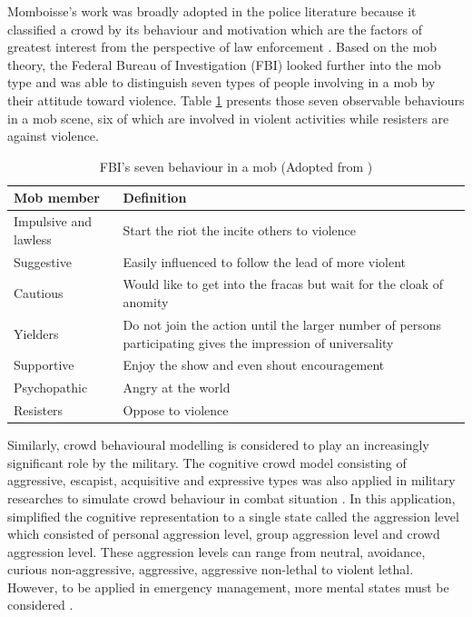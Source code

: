 Momboisse’s work was broadly adopted in the police literature because it classified a crowd by its behaviour and motivation which are the factors of greatest interest from the perspective of law enforcement \citep{FBI1967}. Based on the mob theory, the Federal Bureau of Investigation (FBI) looked further into the mob type and was able to distinguish seven types of people involving in a mob by their attitude toward violence. Table \ref{table:fbiMobBehavior} presents those seven observable behaviours in a mob scene, six of which are involved in violent activities while resisters are against violence.

\begin{table}
	\caption{FBI's seven behaviour in a mob (Adopted from \citet{FBI1967})}
	\label{table:fbiMobBehavior}
	\centering
	\begin{tabular}{|l|p{10cm}|}
		\hline
		\textbf{Mob member} & \textbf{Definition} \\ \hline \hline
		Impulsive and lawless & Start the riot the incite others to violence \\ \hline
		Suggestive &  Easily influenced to follow the lead of more violent \\ \hline
		Cautious & Would like to get into the fracas but wait for the cloak of anomity \\ \hline
		Yielders & Do not join the action until the larger number of persons participating gives the impression of universality \\ \hline
		Supportive & Enjoy the show and even shout encouragement \\ \hline
		Psychopathic & Angry at the world \\ \hline
		Resisters & Oppose to violence \\ \hline
	\end{tabular}
\end{table}

Similarly, crowd behavioural modelling is considered to play an increasingly significant role by the military. The cognitive crowd model consisting of aggressive, escapist, acquisitive and expressive types was also applied in military researches to simulate crowd behaviour in combat situation \citep{Petty2004}. In this application, \citet{Nguyen2005} simplified the cognitive representation to a single state called the aggression level which consisted of personal aggression level, group aggression level and crowd aggression level. These aggression levels can range from neutral, avoidance, curious non-aggressive, aggressive, aggressive non-lethal to violent lethal. However, to be applied in emergency management, more mental states must be considered \citep{Zhou2010}.


